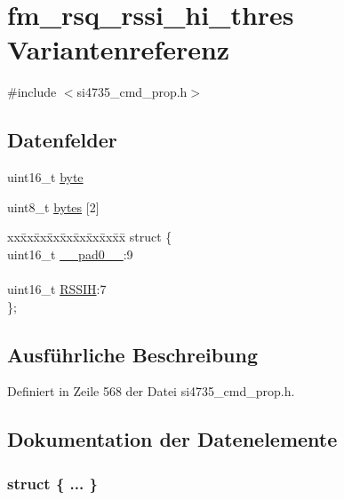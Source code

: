 \hypertarget{unionfm__rsq__rssi__hi__thres}{}\section{fm\+\_\+rsq\+\_\+rssi\+\_\+hi\+\_\+thres Variantenreferenz}
\label{unionfm__rsq__rssi__hi__thres}


{\ttfamily \#include $<$si4735\+\_\+cmd\+\_\+prop.\+h$>$}

\subsection*{Datenfelder}
\begin{DoxyCompactItemize}
\item 
uint16\+\_\+t \hyperlink{unionfm__rsq__rssi__hi__thres_ab0549c1b5ea980a02e7eab77e21fea49}{byte}
\item 
uint8\+\_\+t \hyperlink{unionfm__rsq__rssi__hi__thres_a46e4c05d20a047ec169f60d3167e912e}{bytes} \mbox{[}2\mbox{]}
\item 
\begin{tabbing}
xx\=xx\=xx\=xx\=xx\=xx\=xx\=xx\=xx\=\kill
struct \{\\
\>uint16\_t \hyperlink{unionfm__rsq__rssi__hi__thres_a77132c2c26a75f5b8751b235cda23828}{\_\_pad0\_\_}:9\\
\>\\
\>uint16\_t \hyperlink{unionfm__rsq__rssi__hi__thres_a949ca6113ffa5c822708fdecf9415838}{RSSIH}:7\\
\}; \\

\end{tabbing}\end{DoxyCompactItemize}


\subsection{Ausführliche Beschreibung}


Definiert in Zeile 568 der Datei si4735\+\_\+cmd\+\_\+prop.\+h.



\subsection{Dokumentation der Datenelemente}
\hypertarget{unionfm__rsq__rssi__hi__thres_a05df507bd5ad2062dd23c4b001485bb9}{}\subsubsection[{"@63}]{\setlength{\rightskip}{0pt plus 5cm}struct \{ ... \} }\label{unionfm__rsq__rssi__hi__thres_a05df507bd5ad2062dd23c4b001485bb9}
\hypertarget{unionfm__rsq__rssi__hi__thres_a77132c2c26a75f5b8751b235cda23828}{}
